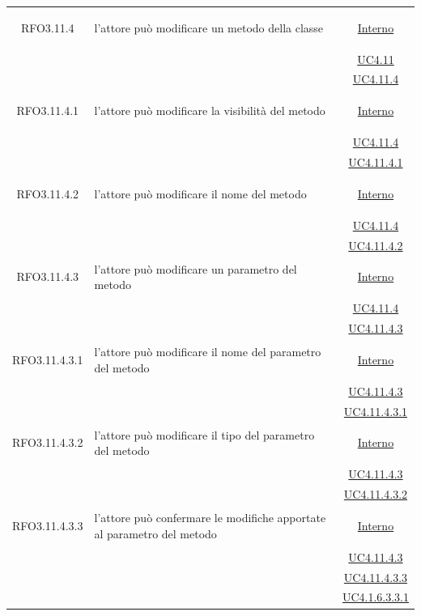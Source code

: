 \begin{longtable}{|c|>{\centering}m{7cm}|c|}
\hypertarget{RFO3.11.4}{RFO3.11.4} & l'attore può modificare un metodo della classe &  \hyperlink{Interno}{Interno}\\
& &\hyperref[UC4.11]{UC4.11}\\
& &\hyperref[UC4.11.4]{UC4.11.4}\\ \hline

\hypertarget{RFO3.11.4.1}{RFO3.11.4.1} & l'attore può modificare la visibilità del metodo &  \hyperlink{Interno}{Interno}\\
& &\hyperref[UC4.11.4]{UC4.11.4}\\
& &\hyperref[UC4.11.4.1]{UC4.11.4.1}\\ \hline

\hypertarget{RFO3.11.4.2}{RFO3.11.4.2} & l'attore può modificare il nome del metodo &  \hyperlink{Interno}{Interno}\\
& &\hyperref[UC4.11.4]{UC4.11.4}\\
& &\hyperref[UC4.11.4.2]{UC4.11.4.2}\\ \hline

\hypertarget{RFO3.11.4.3}{RFO3.11.4.3} & l'attore può modificare un parametro del metodo &  \hyperlink{Interno}{Interno}\\
& &\hyperref[UC4.11.4]{UC4.11.4}\\
& &\hyperref[UC4.11.4.3]{UC4.11.4.3}\\ \hline

\hypertarget{RFO3.11.4.3.1}{RFO3.11.4.3.1} & l'attore può modificare il nome del parametro del metodo &  \hyperlink{Interno}{Interno}\\
& &\hyperref[UC4.11.4.3]{UC4.11.4.3}\\
& &\hyperref[UC4.11.4.3.1]{UC4.11.4.3.1}\\ \hline

\hypertarget{RFO3.11.4.3.2}{RFO3.11.4.3.2} & l'attore può modificare il tipo del parametro del metodo &  \hyperlink{Interno}{Interno}\\
& &\hyperref[UC4.11.4.3]{UC4.11.4.3}\\
& &\hyperref[UC4.11.4.3.2]{UC4.11.4.3.2}\\ \hline

\hypertarget{RFO3.11.4.3.3}{RFO3.11.4.3.3} & l'attore può confermare le modifiche apportate al parametro del metodo &  \hyperlink{Interno}{Interno}\\
& &\hyperref[UC4.11.4.3]{UC4.11.4.3}\\
& &\hyperref[UC4.11.4.3.3]{UC4.11.4.3.3}\\
& &\hyperref[UC4.1.6.3.3.1]{UC4.1.6.3.3.1}\\ \hline


\end{longtable}

